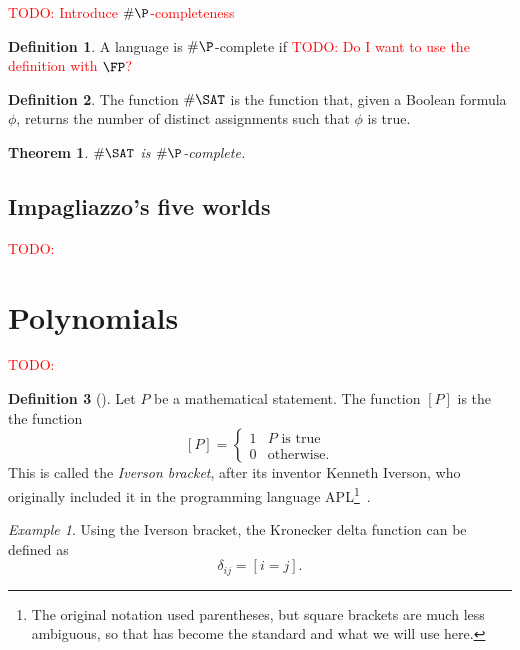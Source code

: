 \documentclass[english,12pt]{reedthesis}
\theoremstyle{plain}
\newtheorem{thm}{Theorem}[section]
\theoremstyle{definition}
\newtheorem{defn}[defn]{Definition}
\theoremstyle{remark}
\newtheorem{example}{Example}[thm]
\newcommand{\TODO}[1]{\textcolor{red}{TODO: #1}}
\begin{document}
\TODO{Introduce $\#\P$-completeness}

\begin{defn}\label{def:hash-p-complete}
  A language is $\#\P$-complete if \TODO{Do I want to use the definition with $\FP$?}
\end{defn}

\begin{defn}\label{def:hash-sat}
  The function $\#\SAT$ is the function that, given a Boolean formula $\phi$,
  returns the number of distinct assignments such that $\phi$ is true.
\end{defn}

\begin{thm}\label{thm-hash-sat-is-complete}
  $\#\SAT$ is $\#\P$-complete.
\end{thm}

\subsection{Impagliazzo's five worlds}

\TODO{}

\section{Polynomials}\label{sec:polynomial}

\TODO{}

\begin{defn}[{\cite{Knu92}}]\label{def:iverson-bracket}
  Let $P$ be a mathematical statement. The function $[P]$ is the the function
  \begin{equation}\label{eqn:iverson-bracket}
    [P] = \begin{cases}
      1 & P \text{ is true} \\
      0 & \text{otherwise.}
    \end{cases}
  \end{equation}
  This is called the \emph{Iverson bracket}, after its inventor Kenneth Iverson,
  who originally included it in the programming language APL\footnote{The
    original notation used parentheses, but square brackets are much less
    ambiguous, so that has become the standard and what we will use
    here.}~\cite[11]{APL}.
\end{defn}

\begin{example}
  Using the Iverson bracket, the Kronecker delta function can be defined as
  \[
    \delta_{ij} = [i = j].
  \]
\end{example}
\end{document}
